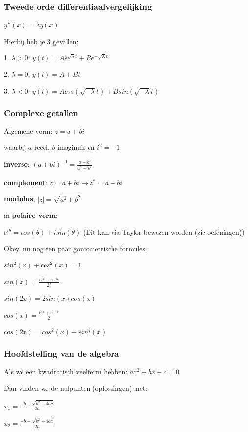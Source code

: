 \documentclass[a4paper]{report}
\begin{document}
\subsubsection{Tweede orde differentiaalvergelijking}

$y''(x) = \lambda y(x)$

Hierbij heb je 3 gevallen:

1. $\lambda > 0$: $y(t) = A e^{\sqrt{\lambda} t} + B e^{-\sqrt{\lambda} t}$

2. $\lambda = 0$: $y(t) = A + Bt$

3. $\lambda < 0$: $y(t) = A cos(\sqrt{-\lambda} t) + B sin(\sqrt{-\lambda} t)$

\subsubsection{Complexe getallen}

Algemene vorm: $z = a + bi$

waarbij $a$ reeel, $b$ imaginair en $i^2 = -1$

\textbf{inverse}: $(a + bi)^{-1} = \frac{a - bi}{a^2 + b^2}$

\textbf{complement}: $z = a + bi \rightarrow z^* = a - bi$

\textbf{modulus}: $|z| = \sqrt{a^2 + b^2}$

in \textbf{polaire vorm}:

$e^{i\theta} = cos(\theta) + i sin(\theta)$ (Dit kan via Taylor bewezen worden (zie oefeningen))

Okey, nu nog een paar goniometrische formules:

$sin^2(x) + cos^2(x) = 1$

$sin(x) = \frac{e^{ix} - e^{-ix}}{2i}$

$sin(2x) = 2sin(x)cos(x)$

$cos(x) = \frac{e^{ix} + e^{-ix}}{2}$

$cos(2x) = cos^2(x) - sin^2(x)$

\subsubsection{Hoofdstelling van de algebra}

Als we een kwadratisch veelterm hebben: $ax^2 + bx + c = 0$

Dan vinden we de nulpunten (oplossingen) met:

$x_1 = \frac{-b + \sqrt{b^2 - 4ac}}{2a}$

$x_2 = \frac{-b - \sqrt{b^2 - 4ac}}{2a}$
\end{document}
